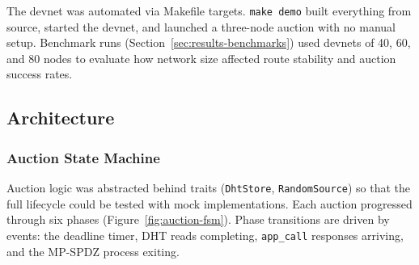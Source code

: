 The devnet was automated via Makefile targets.  \texttt{make demo} built
everything from source, started the devnet, and launched a three-node auction
with no manual setup.  Benchmark runs (Section~\ref{sec:results-benchmarks})
used devnets of 40, 60, and 80 nodes to evaluate how network size affected
route stability and auction success rates.

\subsection{Architecture}
\label{sec:method-architecture}

\subsubsection{Auction State Machine}
\label{sec:method-state-machine}

Auction logic was abstracted behind traits (\texttt{DhtStore},
\texttt{RandomSource}) so that the full lifecycle could be tested with mock
implementations.  Each auction progressed through six phases
(Figure~\ref{fig:auction-fsm}).  Phase transitions are driven by events:
the deadline timer, DHT reads completing, \texttt{app\_call} responses
arriving, and the MP-SPDZ process exiting.

